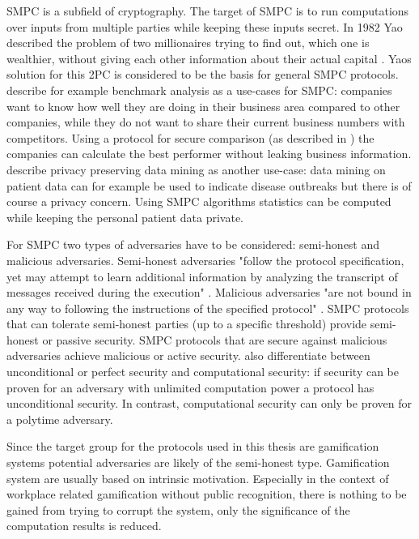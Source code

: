 		\gls{SMPC} is a subfield of cryptography. The target of \gls{SMPC} is to run computations over inputs from multiple parties while keeping these inputs secret. In 1982 Yao described the problem of two millionaires trying to find out, which one is wealthier, without giving each other information about their actual capital \autocite{Yao1982}. Yaos solution for this \gls{2PC} is considered to be the basis for general \gls{SMPC} protocols.
		\textcite{Cramer2015} describe for example benchmark analysis as a use-cases for \gls{SMPC}: companies want to know how well they are doing in their business area compared to other companies, while they do not want to share their current business numbers with competitors. Using a protocol for secure comparison (as described in ) the companies can calculate the best performer without leaking business information. 
		\textcite{Clifton2002} describe privacy preserving data mining as another use-case: data mining on patient data can for example be used to indicate disease outbreaks but there is of course a privacy concern. Using \gls{SMPC} algorithms statistics can be computed while keeping the personal patient data private.
		
		For \gls{SMPC} two types of adversaries have to be considered: semi-honest and malicious adversaries.
		Semi-honest adversaries "follow the protocol specification, yet may attempt to learn additional information by analyzing the transcript of messages received during the execution" \autocite{Aumann2007}. Malicious adversaries "are not bound in any way to following the instructions of the specified protocol" \autocite{Aumann2007}.
		\gls{SMPC} protocols that can tolerate semi-honest parties (up to a specific threshold) provide semi-honest or passive security. \gls{SMPC} protocols that are secure against malicious adversaries achieve malicious or active security.
		\textcite[p. 82]{Cramer2015} also differentiate between unconditional or perfect security and computational security: if security can be proven for an adversary with unlimited computation power a protocol has unconditional security. In contrast, computational security can only be proven for a polytime adversary.
		
		Since the target group for the protocols used in this thesis are gamification systems potential adversaries are likely of the semi-honest type. Gamification system are usually based on intrinsic motivation. Especially in the context of workplace related gamification without public recognition, there is nothing to be gained from trying to corrupt the system, only the significance of the computation results is reduced.
		
